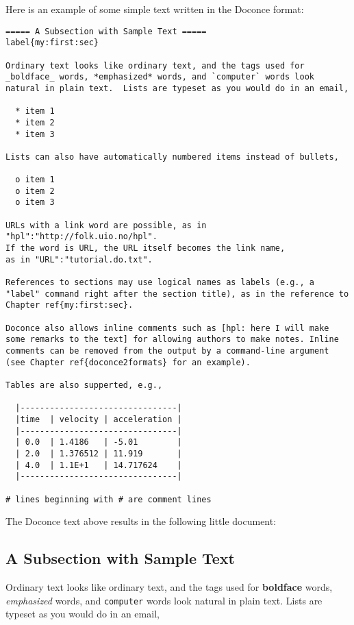 \documentclass{article}
\begin{document}
\noindent
Here is an example of some simple text written in the Doconce format:
\begin{Verbatim}[fontsize=\fontsize{9pt}{9pt},tabsize=8,baselinestretch=0.85,
fontfamily=tt,xleftmargin=7mm]
===== A Subsection with Sample Text =====
label{my:first:sec}

Ordinary text looks like ordinary text, and the tags used for
_boldface_ words, *emphasized* words, and `computer` words look
natural in plain text.  Lists are typeset as you would do in an email,

  * item 1
  * item 2
  * item 3

Lists can also have automatically numbered items instead of bullets,

  o item 1
  o item 2
  o item 3

URLs with a link word are possible, as in "hpl":"http://folk.uio.no/hpl".
If the word is URL, the URL itself becomes the link name,
as in "URL":"tutorial.do.txt".

References to sections may use logical names as labels (e.g., a
"label" command right after the section title), as in the reference to
Chapter ref{my:first:sec}. 

Doconce also allows inline comments such as [hpl: here I will make
some remarks to the text] for allowing authors to make notes. Inline
comments can be removed from the output by a command-line argument
(see Chapter ref{doconce2formats} for an example).

Tables are also supperted, e.g.,

  |--------------------------------|
  |time  | velocity | acceleration |
  |--------------------------------|
  | 0.0  | 1.4186   | -5.01        |
  | 2.0  | 1.376512 | 11.919       |
  | 4.0  | 1.1E+1   | 14.717624    |
  |--------------------------------|

# lines beginning with # are comment lines
\end{Verbatim}
\noindent
The Doconce text above results in the following little document:

\subsection{A Subsection with Sample Text}

\label{my:first:sec}

Ordinary text looks like ordinary text, and the tags used for
\textbf{boldface} words, \emph{emphasized} words, and {\fontsize{10pt}{10pt}\verb!computer!} words look
natural in plain text.  Lists are typeset as you would do in an email,
\end{document}
